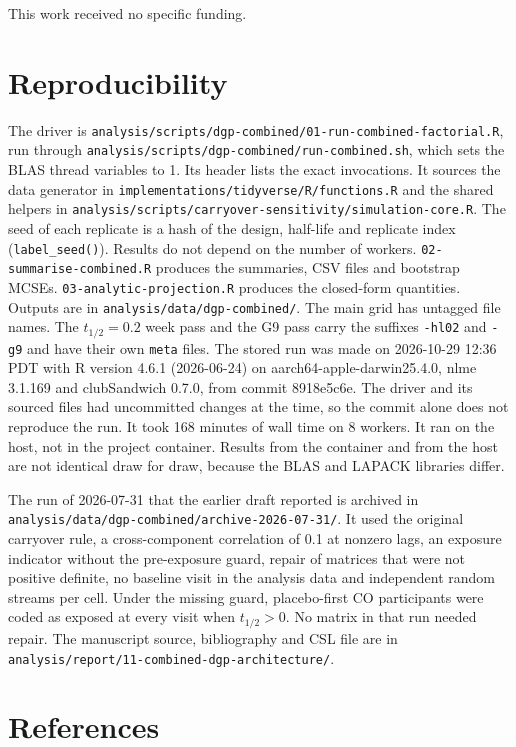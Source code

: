 \documentclass[
  11pt,
]{article}
\begin{document}
This work received no specific funding.

\section*{Reproducibility}\label{reproducibility}

The driver is
\texttt{analysis/scripts/dgp-combined/01-run-combined-factorial.R}, run
through \texttt{analysis/scripts/dgp-combined/run-combined.sh}, which sets the
BLAS thread variables to 1. Its header lists the exact invocations.
It sources the data generator in
\texttt{implementations/tidyverse/R/functions.R} and the shared helpers in
\texttt{analysis/scripts/carryover-sensitivity/simulation-core.R}. The seed of
each replicate is a hash of the design, half-life and replicate index
(\texttt{label\_seed()}). Results do not depend on the number of workers.
\texttt{02-summarise-combined.R} produces the summaries, CSV files and
bootstrap MCSEs. \texttt{03-analytic-projection.R} produces the closed-form
quantities. Outputs are in \texttt{analysis/data/dgp-combined/}. The main
grid has untagged file names. The \(t_{1/2} = 0.2\) week pass and the G9
pass carry the suffixes \texttt{-hl02} and \texttt{-g9} and have their own \texttt{meta}
files.
The stored run was made on 2026-10-29 12:36 PDT with R version 4.6.1 (2026-06-24) on aarch64-apple-darwin25.4.0, nlme 3.1.169 and clubSandwich 0.7.0, from commit 8918e5c6e. The driver and its sourced files had uncommitted changes at the time, so the commit alone does not reproduce the run. It took 168 minutes of wall time on 8 workers.
It ran on the host, not in the project container. Results from the
container and from the host are not identical draw for draw, because
the BLAS and LAPACK libraries differ.

The run of 2026-07-31 that the earlier draft reported is archived in
\texttt{analysis/data/dgp-combined/archive-2026-07-31/}. It used the original
carryover rule, a cross-component correlation of 0.1 at nonzero lags,
an exposure indicator without the pre-exposure guard, repair of
matrices that were not positive definite, no baseline visit in the
analysis data and independent random streams per cell. Under the
missing guard, placebo-first CO participants were coded as exposed at
every visit when \(t_{1/2} > 0\). No matrix in that run needed repair.
The manuscript source, bibliography and CSL file are in
\texttt{analysis/report/11-combined-dgp-architecture/}.

\section*{References}\label{references}
\end{document}
